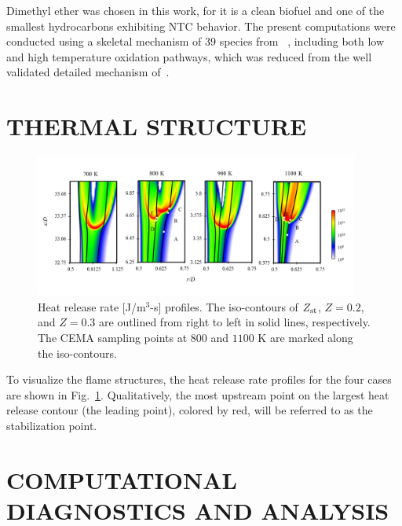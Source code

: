 \documentclass[twocolumn,10pt]{hphrc}
\begin{document}
Dimethyl ether was chosen in this work, for it is a clean biofuel and one of the smallest hydrocarbons exhibiting NTC behavior.  The present computations were conducted using a skeletal mechanism of $39$ species from ~\cite{bansal11}, including both low and high temperature oxidation pathways, which was reduced from the well validated detailed mechanism of~\cite{zhao08}.

\section*{THERMAL STRUCTURE}


\begin{figure}[t!]
  \centering
  \includegraphics[width=4.2in]{HRR}
  \caption{Heat release rate [J/m$^3$-s] profiles.  The iso-contours of $Z_{\rm st}$, $Z = 0.2$, and $Z = 0.3$ are outlined from right to left in solid lines, respectively.  The CEMA sampling points at $800$ and $1100$ K are marked along the iso-contours.}
  \label{fig:HRR}
\end{figure}

To visualize the flame structures, the heat release rate profiles for the four cases are shown in Fig.~\ref{fig:HRR}.  Qualitatively, the most upstream point on the largest heat release contour (the leading point), colored by red, will be referred to as the stabilization point.




\section*{COMPUTATIONAL DIAGNOSTICS AND ANALYSIS}
\end{document}
